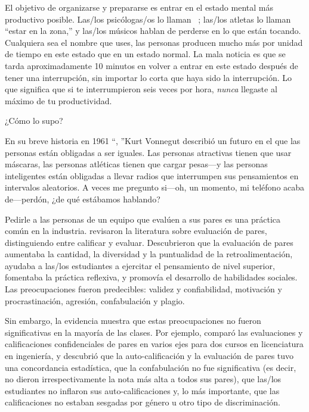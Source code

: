 El objetivo de organizarse y prepararse es
entrar en el estado mental más productivo posible.
Las/los psicólogas/os lo llaman ~\cite{Csik2008};
las/los atletas lo llaman ``estar en la zona,''
y las/los músicos hablan de perderse en lo que están tocando.
Cualquiera sea el nombre que uses,
las personas producen mucho más por unidad de tiempo en este estado que en un estado normal.
La mala noticia es que
se tarda aproximadamente 10 minutos en volver a entrar en este estado después de tener una interrupción,
sin importar lo corta que haya sido la interrupción.
Lo que significa que si te interrumpieron seis veces por hora,
\emph{nunca} llegaste al máximo de tu productividad.

\newpage

\begin{aside}{¿Cómo lo supo?}

  En su breve historia en 1961 ``, ''Kurt Vonnegut describió un futuro en el que las personas están obligadas a ser iguales.
  Las personas atractivas tienen que usar máscaras,
  las personas atléticas tienen que cargar pesas---y las personas inteligentes
  están obligadas a llevar radios que interrumpen sus pensamientos en intervalos aleatorios.
  A veces me pregunto si---oh, un momento, mi teléfono acaba de---perdón, ¿de qué estábamos hablando?

\end{aside}


Pedirle a las personas de un equipo que evalúen a sus pares es una práctica común en la industria.
\cite{Sond2012} revisaron la literatura sobre evaluación de pares,
distinguiendo entre calificar y evaluar.
Descubrieron que la evaluación de pares aumentaba la cantidad, la diversidad y la puntualidad de la retroalimentación,
ayudaba a las/los estudiantes a ejercitar el pensamiento de nivel superior,
fomentaba la práctica reflexiva,
y promovía el desarrollo de habilidades sociales.
Las preocupaciones fueron predecibles:
validez y confiabilidad,
motivación y procrastinación,
agresión, confabulación y plagio.

Sin embargo,
la evidencia muestra que estas preocupaciones no fueron significativas en la mayoría de las clases.
Por ejemplo,
\cite{Kauf2000} comparó las evaluaciones y calificaciones confidenciales de pares en varios ejes
para dos cursos en licenciatura en ingeniería,
y descubrió que la auto-calificación y la evaluación de pares tuvo una concordancia estadística,
que la confabulación no fue significativa (es decir, no dieron irrespectivamente la nota más alta a todos sus pares),
que las/los estudiantes no inflaron sus auto-calificaciones
y, lo más importante,
que las calificaciones no estaban sesgadas por género u otro tipo de discriminación.

